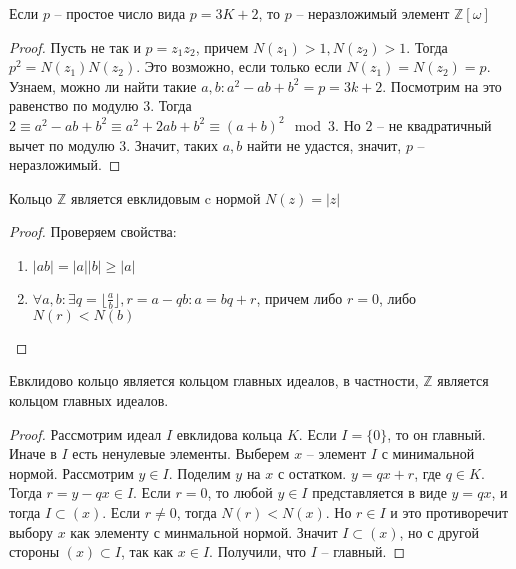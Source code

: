 \documentclass{article}
\begin{document}
\begin{statement}
    Если $p$ -- простое число вида $p = 3K+2$, то $p$ -- неразложимый элемент $\mathbb{Z}[\omega]$
\end{statement}

\begin{proof}
    Пусть не так и $p = z_1 z_2$, причем $N(z_1) > 1, N(z_2) > 1$. Тогда $p^2 = N(z_1) N(z_2)$. Это возможно, если
    только если $N(z_1) = N(z_2) = p$. Узнаем, можно ли найти такие $a, b: a^2 - ab + b^2 = p = 3k+2$. Посмотрим на это
    равенство по модулю $3$. Тогда $2 \equiv a^2 - ab + b^2 \equiv a^2 + 2ab + b^2 \equiv (a + b)^2 \mod 3$. Но $2$ --
    не квадратичный вычет по модулю $3$. Значит, таких $a, b$ найти не удастся, значит, $p$ -- неразложимый.
\end{proof}

\begin{statement}
    Кольцо $\mathbb{Z}$ является евклидовым c нормой $N(z) = |z|$
\end{statement}

\begin{proof}
    Проверяем свойства:
    \begin{enumerate}
        \item $|ab| = |a||b| \geq |a|$
        \item $\forall a, b: \exists q = \lfloor \frac{a}{b} \rfloor, r = a - qb: a = bq + r$, причем либо $r = 0$, либо
            $N(r) < N(b)$
    \end{enumerate}
\end{proof}

\begin{statement}
    Евклидово кольцо является кольцом главных идеалов, в частности, $\mathbb{Z}$ является кольцом главных идеалов.
\end{statement}

\begin{proof}
    Рассмотрим идеал $I$ евклидова кольца $K$. Если $I = \{0\}$, то он главный. Иначе в $I$ есть ненулевые элементы.
    Выберем $x$ -- элемент $I$ с минимальной нормой. Рассмотрим $y \in I$. Поделим $y$ на $x$ с остатком. $y = qx + r$,
    где $q \in K$. Тогда $r = y - qx \in I$. Если $r = 0$, то любой $y \in I$ представляется в виде $y = qx$, и тогда
    $I \subset (x)$. Если $r \neq 0$, тогда $N(r) < N(x)$. Но $r \in I$ и это противоречит выбору $x$ как элементу с
    минмальной нормой. Значит $I \subset(x)$, но с другой стороны $(x) \subset I$, так как $x \in I$. Получили, что $I$
    -- главный.
\end{proof}
\end{document}

